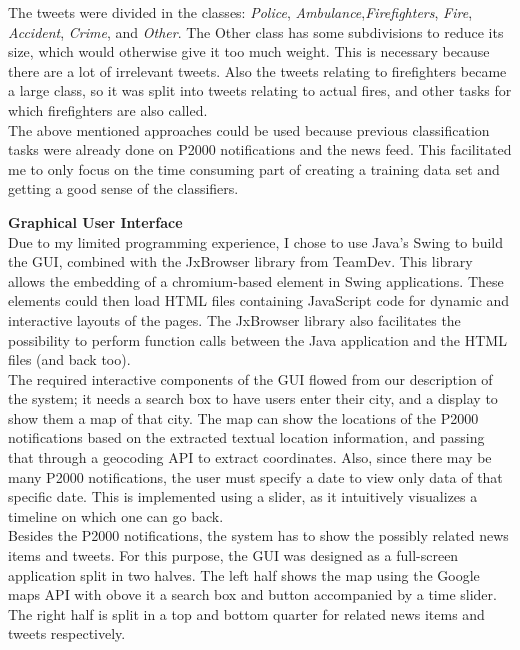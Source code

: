 The tweets were divided in the classes: \emph{Police}, \emph{Ambulance},\emph{Firefighters}, \emph{Fire}, \emph{Accident}, \emph{Crime},  and \emph{Other}. The Other class has some subdivisions to reduce its size, which would otherwise give it too much weight. This is necessary because there are a lot of irrelevant tweets. Also the tweets relating to firefighters became a large class, so it was split into tweets relating to actual fires, and other tasks for which firefighters are also called.\\

The above mentioned approaches could be used because previous classification tasks were already done on P2000 notifications and the news feed. This facilitated me to only focus on the time consuming part of creating a training data set and getting a good sense of the classifiers.

\textbf{Graphical User Interface}\\
Due to my limited programming experience, I chose to use Java's Swing to build the GUI, combined with the JxBrowser library from TeamDev. This library allows the embedding of a chromium-based element in Swing applications. These elements could then load HTML files containing JavaScript code for dynamic and interactive layouts of the pages. The JxBrowser library also facilitates the possibility to perform function calls between the Java application and the HTML files (and back too).\\ 

The required interactive components of the GUI flowed from our description of the system; it needs a search box to have users enter their city, and a display to show them a map of that city. The map can show the locations of the P2000 notifications based on the extracted textual location information, and passing that through a geocoding API to extract coordinates. Also, since there may be many P2000 notifications, the user must specify a date to view only data of that specific date. This is implemented using a slider, as it intuitively visualizes a timeline on which one can go back. \\
Besides the P2000 notifications, the system has to show the possibly related news items and tweets. For this purpose, the GUI was designed as a full-screen 
application split in two halves. The left half shows the map using the Google maps API with obove it a search box and button accompanied by a time slider. The right half is split in a top and bottom quarter for related news items and tweets respectively. \\

